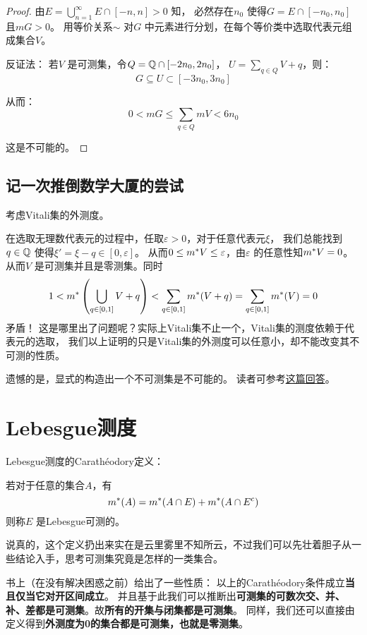 \begin{proof}
    由\(E= \bigcup_{n=1}^{\infty} E\cap [-n,n]>0\) 知，
    必然存在\(n_{0}\) 使得\(G=E\cap [-n_{0},n_{0}]\) 且\(mG>0\)。
    用等价关系\(\sim\) 对\(G\) 中元素进行分划，在每个等价类中选取代表元组成集合\(V\)。

    反证法： 若\(V\) 是可测集，令\(Q=\mathbb{Q}\cap[-2n_{0},2n_{0}]\)，
    \(U=\sum_{q\in Q} V+q\)，则：
    \[
        G \subseteq U \subset [-3n_{0},3n_{0}]
    \]

    从而： \[
        0<m G\leq \sum_{q\in Q} mV<6n_{0}
    \]

    这是不可能的。
\end{proof}

\subsection{记一次推倒数学大厦的尝试}
考虑Vitali集的外测度。

在选取无理数代表元的过程中，任取\(\varepsilon>0\)，对于任意代表元\(\xi\)，
我们总能找到\(q \in \mathbb{Q}\) 使得\(\xi'=\xi-q \in [0,\varepsilon]\)。
从而\(0\leq m^{*} V\leq \varepsilon\)，由\(\varepsilon\)
的任意性知\(m^{*} V=0\)。从而\(V\) 是可测集并且是零测集。同时\[
    1<m^{*}\left( \bigcup_{q\in [0,1]} V+q  \right) < \sum_{q
    \in [0,1]} m^{*}(V+q) = \sum_{q\in [0,1]} m^{*}(V) = 0
\]
矛盾！
这是哪里出了问题呢？实际上Vitali集不止一个，Vitali集的测度依赖于代表元的选取，
我们以上证明的只是Vitali集的外测度可以任意小，却不能改变其不可测的性质。

遗憾的是，显式的构造出一个不可测集是不可能的。
读者可参考\href{https://math.stackexchange.com/questions/226559/examples-of-non-measurable-sets-in-mathbbr}{这篇回答}。

\section{Lebesgue测度}
Lebesgue测度的Carathéodory定义：
\begin{definition}
    若对于任意的集合\(A\)，有
    \[
        m^{*}(A)=m^{*}(A\cap E)+m^{*}(A\cap E^{c})
    \]
    则称\(E\) 是Lebesgue可测的。
\end{definition}

说真的，这个定义扔出来实在是云里雾里不知所云，不过我们可以先壮着胆子从一些结论入手，思考可测集究竟是怎样的一类集合。

书上（在没有解决困惑之前）给出了一些性质： 以上的Carathéodory条件成立\textbf{当且仅当它对开区间成立}。
并且基于此我们可以推断出\textbf{可测集的可数次交、并、补、差都是可测集}。故\textbf{所有的开集与闭集都是可测集}。
同样，我们还可以直接由定义得到\textbf{外测度为0的集合都是可测集，也就是零测集}。

